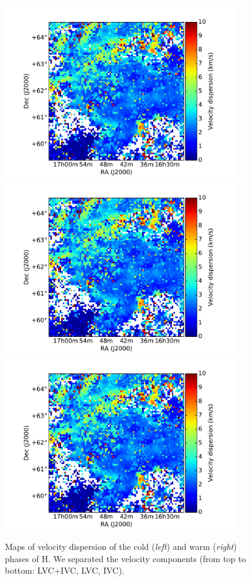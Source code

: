 \documentclass[traditabstract]{aa}
\begin{document}
\begin{figure}[h]
  \hspace{5mm}
  \includegraphics[page=5,height=7.5cm,trim=110 35 105 75,clip=true]{Figures/GHIGLS_disp.pdf} \\
  \vspace{5mm}
  \includegraphics[page=3,height=7.5cm,trim=110 35 105 75,clip=true]{Figures/GHIGLS_disp.pdf}
  \hspace{5mm}
  \includegraphics[page=6,height=7.5cm,trim=110 35 105 75,clip=true]{Figures/GHIGLS_disp.pdf}
  \caption{Maps of velocity dispersion of the cold (\emph{left}) and warm (\emph{right}) phases of H. We separated the velocity components (from top to bottom: LVC+IVC, LVC, IVC).}
\end{figure}
\end{document}
